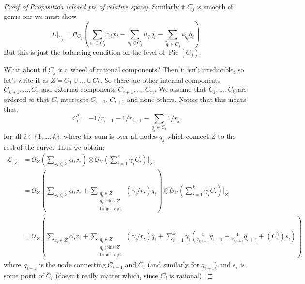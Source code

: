 \documentclass[11pt]{amsart}
\newcommand{\OO}{\mathcal{O}}
\newcommand{\Pic}{\operatorname{Pic}}
\newcommand{\Ccal}{\mathcal{C}}
\newcommand{\Lcal}{\mathcal{L}}
\theoremstyle{definition}
\theoremstyle{definition}
\begin{document}
\begin{proof}[Proof of Proposition \ref{closed pts of relative space}]
Similarly if $C_j$ is smooth of genus one we must show:
\begin{equation*} L|_{C_j} = \OO_{C_j} \left( \sum_{x_i \in C_j} \alpha_i x_i - \sum_{q_i \in C_j} u_{q_i} q_i - \sum_{\tilde{q}_i \in C_j} u_{\tilde{q}_i} \tilde{q}_i \right) \end{equation*}
But this is just the balancing condition on the level of $\Pic(C_j)$. 

What about if $C_j$ is a wheel of rational components? Then it isn't irreducible, so let's write it as $Z= C_1 \cup \ldots \cup C_k$. So there are other internal components $C_{k+1},\ldots,C_r$ and external components $C_{r+1},\ldots,C_m$. We assume that $C_1,\ldots,C_k$ are ordered so that $C_i$ intersects $C_{i-1}$, $C_{i+1}$ and none others. Notice that this means that:
\begin{equation*} C_i^2 = -1/r_{i-1} - 1/r_{i+1} - \sum_{q_j \in C_i} 1/r_j \end{equation*}
for all $i \in \{1,\ldots,k\}$, where the sum is over all nodes $q_j$ which connect $Z$ to the rest of the curve. Thus we obtain:
\begin{align*} \Lcal|_Z & = \OO_Z \left( \sum_{x_i \in Z} \alpha_i x_i\right) \otimes \OO_{\Ccal} \left( \sum_{i=1}^r \gamma_i C_i \right)\bigg|_Z \\
& = \OO_Z \left( \sum_{x_i \in Z} \alpha_i x_i + \sum_{\substack{q_i \in Z \\ \text{$q_i$ joins $Z$} \\ \text{to int. cpt.}}} (\gamma_i/r_i) q_i \right) \otimes \OO_{\Ccal} \left( \sum_{i=1}^k \gamma_i C_i \right) \bigg|_Z \\
& = \OO_Z \left( \sum_{x_i \in Z} \alpha_i x_i + \sum_{\substack{q_i \in Z \\ \text{$q_i$ joins $Z$} \\ \text{to int. cpt.}}} (\gamma_i/r_i) q_i + \sum_{i=1}^k \gamma_i \left( \frac{1}{r_{i,i-1}} q_{i-1} + \frac{1}{r_{i,i+1}} q_{i+1} + (C_i^2) s_i \right)\right)
\end{align*}
where $q_{i-1}$ is the node connecting $C_{i-1}$ and $C_i$ (and similarly for $q_{i+1}$) and $s_i$ is some point of $C_i$ (doesn't really matter which, since $C_i$ is rational).


\end{proof}
\end{document}

